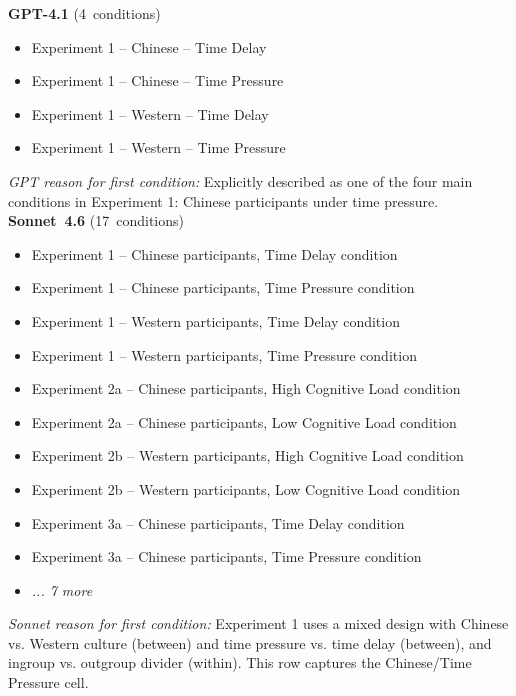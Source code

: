 \documentclass[11pt,a4paper]{article}
\begin{document}
              \begin{tcolorbox}[
            title={\textbf{Case 1 — GPT omits later experiments (sonnet\textbackslash{}\_splits\textbackslash{}\_gpt)} (name-match 100\%) --- DOI: 10.1016\_j.jesp.2022.104284},
            colback=orange!4!white, colframe=orange!55!black,
            fonttitle=\small\sffamily,
            sidebyside, sidebyside align=top seam,
            lower separated=false, breakable,
            before upper={\small}, before lower={\small},
          ]
          \textbf{GPT-4.1} (4~conditions)\\[4pt]
          \begin{itemize}[leftmargin=*,noitemsep,topsep=0pt]
            \item Experiment 1 – Chinese – Time Delay
\item Experiment 1 – Chinese – Time Pressure
\item Experiment 1 – Western – Time Delay
\item Experiment 1 – Western – Time Pressure
          \end{itemize}
          \medskip\textit{GPT reason for first condition:} Explicitly described as one of the four main conditions in Experiment 1: Chinese participants under time pressure.
          \tcblower
          \textbf{Sonnet~4.6} (17~conditions)\\[4pt]
          \begin{itemize}[leftmargin=*,noitemsep,topsep=0pt]
            \item Experiment 1 – Chinese participants, Time Delay condition
\item Experiment 1 – Chinese participants, Time Pressure condition
\item Experiment 1 – Western participants, Time Delay condition
\item Experiment 1 – Western participants, Time Pressure condition
\item Experiment 2a – Chinese participants, High Cognitive Load condition
\item Experiment 2a – Chinese participants, Low Cognitive Load condition
\item Experiment 2b – Western participants, High Cognitive Load condition
\item Experiment 2b – Western participants, Low Cognitive Load condition
\item Experiment 3a – Chinese participants, Time Delay condition
\item Experiment 3a – Chinese participants, Time Pressure condition
\item \textit{... 7 more}
          \end{itemize}
          \medskip\textit{Sonnet reason for first condition:} Experiment 1 uses a mixed design with Chinese vs. Western culture (between) and time pressure vs. time delay (between), and ingroup vs. outgroup divider (within). This row captures the Chinese/Time Pressure cell.
          \end{tcolorbox}
\end{document}
